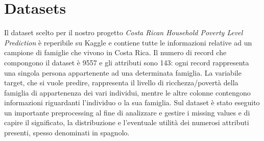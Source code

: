 \section{Datasets}




Il dataset scelto per il nostro progetto \textit{Costa Rican Household Poverty Level Prediction} è reperibile su Kaggle \cite{kaggleCostaRican} e contiene tutte le informazioni relative ad un campione di famiglie che vivono in Costa Rica. Il numero di record che compongono il dataset è 9557 e gli attributi sono 143: ogni record rappresenta una singola persona appartenente ad una determinata famiglia.
La variabile target, che si vuole predire, rappresenta il livello di ricchezza/povertà della famiglia di appartenenza dei vari individui, mentre le altre colonne contengono informazioni riguardanti l'individuo o la sua famiglia.
Sul dataset è stato eseguito un importante preprocessing al fine di analizzare e gestire i missing values e di capire il significato, la distribuzione e l'eventuale utilità dei numerosi attributi presenti, spesso denominati in spagnolo. 

